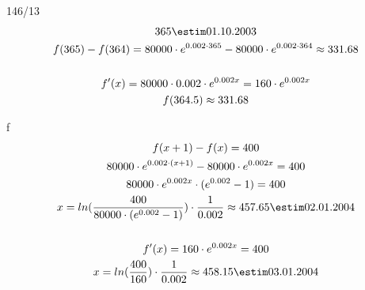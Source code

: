 \begin{exercise}{146/13}
  \begin{gather*}
    365 \estim 01.10.2003 \\
    f(365) - f(364) = 80000 \cdot e^{0.002 \cdot 365} - 80000 \cdot e^{0.002 \cdot 364} \approx 331.68 \\\\
    f'(x) = 80000 \cdot 0.002 \cdot e^{0.002x} = 160 \cdot e^{0.002x} \\
    f(364.5) \approx 331.68
  \end{gather*}
  \item [f]
  \begin{gather*}
    f(x + 1) - f(x) = 400 \\
    80000 \cdot e^{0.002 \cdot (x + 1)} - 80000 \cdot e^{0.002x} = 400 \\
    80000 \cdot e^{0.002x} \cdot (e^{0.002} - 1) = 400 \\
    x = ln(\frac{400}{80000 \cdot (e^{0.002} - 1)}) \cdot \frac{1}{0.002} \approx 457.65 \estim 02.01.2004 \\\\
    f'(x) = 160 \cdot e^{0.002x} = 400 \\
    x = ln(\frac{400}{160}) \cdot \frac{1}{0.002} \approx 458.15 \estim 03.01.2004
  \end{gather*}
\end{exercise}


